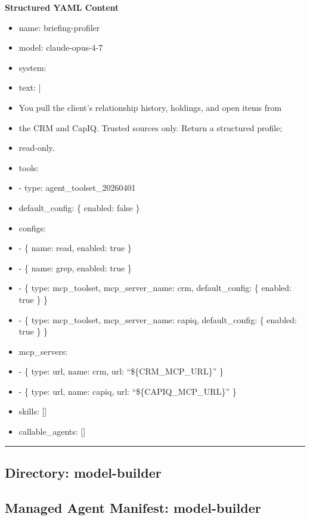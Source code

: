 \documentclass[11pt]{article}
\begin{document}
\textbf{Structured YAML Content}
\begin{itemize}[leftmargin=*,itemsep=2pt,topsep=2pt]
\item {} name: briefing-profiler
\item {} model: claude-opus-4-7
\item {} system:
\item {} text: |
\item {} You pull the client's relationship history, holdings, and open items from
\item {} the CRM and CapIQ. Trusted sources only. Return a structured profile;
\item {} read-only.
\item {} tools:
\item {} - type: agent\_\allowbreak{}toolset\_\allowbreak{}20260401
\item {} default\_\allowbreak{}config: \{ enabled: false \}
\item {} configs:
\item {} - \{ name: read, enabled: true \}
\item {} - \{ name: grep, enabled: true \}
\item {} - \{ type: mcp\_\allowbreak{}toolset, mcp\_\allowbreak{}server\_\allowbreak{}name: crm, default\_\allowbreak{}config: \{ enabled: true \} \}
\item {} - \{ type: mcp\_\allowbreak{}toolset, mcp\_\allowbreak{}server\_\allowbreak{}name: capiq, default\_\allowbreak{}config: \{ enabled: true \} \}
\item {} mcp\_\allowbreak{}servers:
\item {} - \{ type: url, name: crm, url: ``\$\{CRM\_\allowbreak{}MCP\_\allowbreak{}URL\}'' \}
\item {} - \{ type: url, name: capiq, url: ``\$\{CAPIQ\_\allowbreak{}MCP\_\allowbreak{}URL\}'' \}
\item {} skills: []
\item {} callable\_\allowbreak{}agents: []
\end{itemize}

\vspace{0.8em}\hrule\vspace{0.8em}

\subsection{Directory: model-builder}

\subsection{Managed Agent Manifest: model-builder}\label{file:model-builder-agent-yaml}
\end{document}
